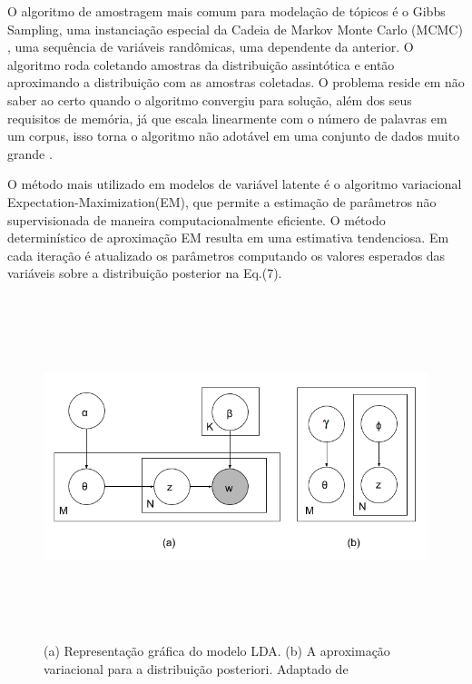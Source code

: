 \documentclass[12pt,a4paper]{article}
\begin{document}
O algoritmo de amostragem mais comum para modelação de tópicos é o Gibbs Sampling, uma instanciação especial da Cadeia de Markov Monte Carlo (MCMC) \cite{jordan1999introduction},
 uma sequência de variáveis randômicas, uma dependente da anterior. O algoritmo roda coletando amostras da distribuição assintótica e então aproximando a distribuição com as amostras coletadas.
 O problema reside em não saber ao certo  quando o algoritmo convergiu para solução, além dos seus requisitos de memória, já que escala linearmente com o número de palavras em um corpus,
 isso torna o algoritmo não adotável em uma conjunto de dados muito grande \cite{vrehuuvrek2011scalability}.

O método mais utilizado em modelos de variável latente é o algoritmo variacional Expectation-Maximization(EM), que permite a estimação de parâmetros não supervisionada de maneira computacionalmente eficiente. O método determinístico de aproximação EM resulta em uma estimativa tendenciosa. Em cada iteração é atualizado os parâmetros computando os valores esperados das variáveis sobre a distribuição posterior na Eq.(7).


\begin{figure}[H]
	\centering
    \includegraphics[height=10cm]{images/figure_2.png}
    \caption{(a) Representação gráfica do modelo LDA. (b) A aproximação variacional para a distribuição posteriori. Adaptado de }
\end{figure}
\end{document}
